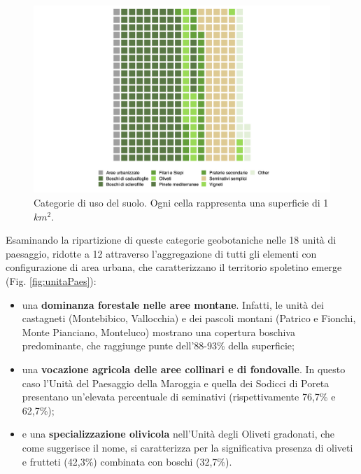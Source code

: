 \documentclass[
  a4paper,
]{book}
\begin{document}
\begin{figure}
\includegraphics[width=\linewidth]{./figs/RECSpoleto_usoSuoloPlot} \caption{Categorie di uso del suolo. Ogni cella rappresenta una superficie di 1 $km^2$.}\label{fig:usoSuolo}
\end{figure}

Esaminando la ripartizione di queste categorie geobotaniche nelle 18 unità di paesaggio, ridotte a 12 attraverso l'aggregazione di tutti gli elementi con configurazione di area urbana, che caratterizzano il territorio spoletino emerge (Fig. \ref{fig:unitaPaes}):

\begin{itemize}
\item
  una \textbf{dominanza forestale nelle aree montane}.
  Infatti, le unità dei castagneti (Montebibico, Vallocchia) e dei pascoli montani (Patrico e Fionchi, Monte Pianciano, Monteluco) mostrano una copertura boschiva predominante, che raggiunge punte dell'88-93\% della superficie;
\item
  una \textbf{vocazione agricola delle aree collinari e di fondovalle}.
  In questo caso l'Unità del Paesaggio della Maroggia e quella dei Sodicci di Poreta presentano un'elevata percentuale di seminativi (rispettivamente 76,7\% e 62,7\%);
\item
  e una \textbf{specializzazione olivicola} nell'Unità degli Oliveti gradonati, che come suggerisce il nome, si caratterizza per la significativa presenza di oliveti e frutteti (42,3\%) combinata con boschi (32,7\%).
\end{itemize}
\end{document}
